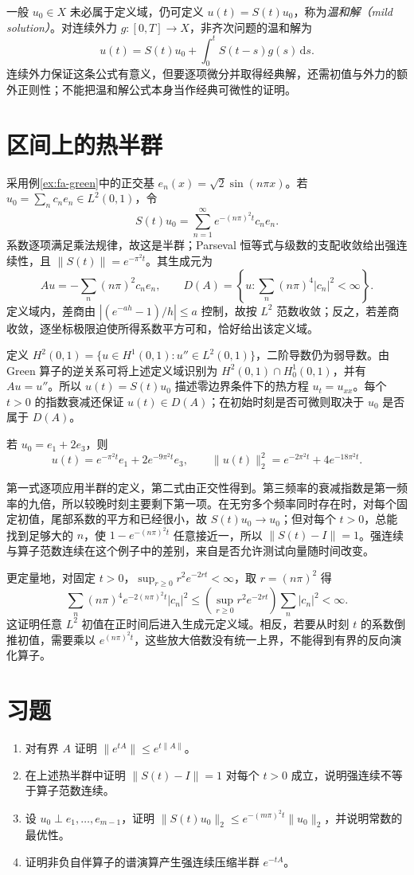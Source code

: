 一般 $u_0\in X$ 未必属于定义域，仍可定义 $u(t)=S(t)u_0$，称为\emph{温和解（mild solution）}。对连续外力 $g:[0,T]\to X$，非齐次问题的温和解为
\[
 u(t)=S(t)u_0+\int_0^tS(t-s)g(s)\,\mathrm ds.
\]
连续外力保证这条公式有意义，但要逐项微分并取得经典解，还需初值与外力的额外正则性；不能把温和解公式本身当作经典可微性的证明。

\section{区间上的热半群}
采用例\ref{ex:fa-green}中的正交基 $e_n(x)=\sqrt2\sin(n\pi x)$。若 $u_0=\sum_nc_ne_n\in L^2(0,1)$，令
\[
 S(t)u_0=\sum_{n=1}^{\infty}e^{-(n\pi)^2t}c_ne_n.
\]
系数逐项满足乘法规律，故这是半群；Parseval 恒等式与级数的支配收敛给出强连续性，且 $\|S(t)\|=e^{-\pi^2t}$。其生成元为
\[
 Au=-\sum_n(n\pi)^2c_ne_n,\qquad
 D(A)=\left\{u:\sum_n(n\pi)^4|c_n|^2<\infty\right\}.
\]
定义域内，差商由 $|(e^{-ah}-1)/h|\leq a$ 控制，故按 $L^2$ 范数收敛；反之，若差商收敛，逐坐标极限迫使所得系数平方可和，恰好给出该定义域。

定义 $H^2(0,1)=\{u\in H^1(0,1):u''\in L^2(0,1)\}$，二阶导数仍为弱导数。由 Green 算子的逆关系可将上述定义域识别为 $H^2(0,1)\cap H_0^1(0,1)$，并有 $Au=u''$。所以 $u(t)=S(t)u_0$ 描述零边界条件下的热方程 $u_t=u_{xx}$。每个 $t>0$ 的指数衰减还保证 $u(t)\in D(A)$；在初始时刻是否可微则取决于 $u_0$ 是否属于 $D(A)$。

\begin{example}[两个频率的衰减速度]
若 $u_0=e_1+2e_3$，则
\[
 u(t)=e^{-\pi^2t}e_1+2e^{-9\pi^2t}e_3,
 \qquad\|u(t)\|_2^2=e^{-2\pi^2t}+4e^{-18\pi^2t}.
\]
\end{example}
\begin{solve}
第一式逐项应用半群的定义，第二式由正交性得到。第三频率的衰减指数是第一频率的九倍，所以较晚时刻主要剩下第一项。在无穷多个频率同时存在时，对每个固定初值，尾部系数的平方和已经很小，故 $S(t)u_0\to u_0$；但对每个 $t>0$，总能找到足够大的 $n$，使 $1-e^{-(n\pi)^2t}$ 任意接近一，所以 $\|S(t)-I\|=1$。强连续与算子范数连续在这个例子中的差别，来自是否允许测试向量随时间改变。
\end{solve}

更定量地，对固定 $t>0$，$\sup_{r\geq0}r^2e^{-2rt}<\infty$，取 $r=(n\pi)^2$ 得
\[
 \sum_n(n\pi)^4e^{-2(n\pi)^2t}|c_n|^2
 \leq\left(\sup_{r\geq0}r^2e^{-2rt}\right)\sum_n|c_n|^2<\infty.
\]
这证明任意 $L^2$ 初值在正时间后进入生成元定义域。相反，若要从时刻 $t$ 的系数倒推初值，需要乘以 $e^{(n\pi)^2t}$，这些放大倍数没有统一上界，不能得到有界的反向演化算子。

\section{习题}
\begin{enumerate}
 \item 对有界 $A$ 证明 $\|e^{tA}\|\leq e^{t\|A\|}$。
 \item 在上述热半群中证明 $\|S(t)-I\|=1$ 对每个 $t>0$ 成立，说明强连续不等于算子范数连续。
 \item 设 $u_0\perp e_1,\ldots,e_{m-1}$，证明 $\|S(t)u_0\|_2\leq e^{-(m\pi)^2t}\|u_0\|_2$，并说明常数的最优性。
 \item 证明非负自伴算子的谱演算产生强连续压缩半群 $e^{-tA}$。
\end{enumerate}

